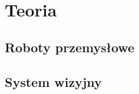 \chapter{Teoria}
\label{cha:teoria}

\section{Roboty przemysłowe}
\label{sec:robotyPrzemyslowe}

\section{System wizyjny}
\label{sec:systemWizyjny}
